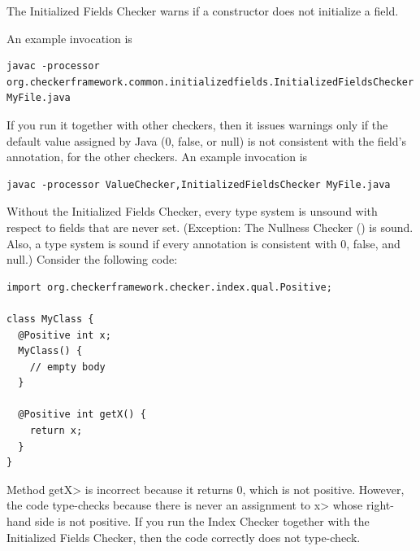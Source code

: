 
The Initialized Fields Checker warns if a constructor does not initialize a
field.



An example invocation is

\begin{Verbatim}
javac -processor org.checkerframework.common.initializedfields.InitializedFieldsChecker MyFile.java
\end{Verbatim}

If you run it together with other checkers, then it issues warnings only if
the default value assigned by Java (0, false, or null) is not consistent
with the field's annotation, for the other checkers.
An example invocation is

\begin{Verbatim}
javac -processor ValueChecker,InitializedFieldsChecker MyFile.java
\end{Verbatim}



Without the Initialized Fields Checker, every type system is
unsound with respect to fields that are never set.  (Exception:  The
Nullness Checker () is sound. Also, a type
system is sound if every annotation is consistent with 0, false, and null.)
Consider the following code:

\begin{Verbatim}
import org.checkerframework.checker.index.qual.Positive;

class MyClass {
  @Positive int x;
  MyClass() {
    // empty body
  }

  @Positive int getX() {
    return x;
  }
}
\end{Verbatim}

\noindent
Method \<getX> is incorrect because it returns 0, which is not positive.
However, the code type-checks because there is never an assignment to \<x>
whose right-hand side is not positive.
If you run the Index Checker together with the Initialized Fields Checker,
then the code correctly does not type-check.


